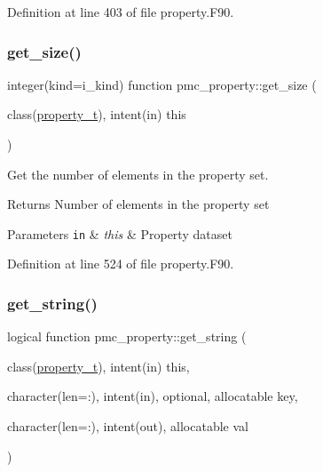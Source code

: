 Definition at line 403 of file property.\+F90.

\mbox{\label{namespacepmc__property_a51142a5a96c616638b781bc56dd808a9}} 
\subsubsection{\texorpdfstring{get\+\_\+size()}{get\_size()}}
{\footnotesize\ttfamily integer(kind=i\+\_\+kind) function pmc\+\_\+property\+::get\+\_\+size (\begin{DoxyParamCaption}\item[{class(\mbox{\hyperlink{structpmc__property_1_1property__t}{property\+\_\+t}}), intent(in)}]{this }\end{DoxyParamCaption})\hspace{0.3cm}{\ttfamily [private]}}



Get the number of elements in the property set. 

\begin{DoxyReturn}{Returns}
Number of elements in the property set
\end{DoxyReturn}

\begin{DoxyParams}[1]{Parameters}
\mbox{\tt in}  & {\em this} & Property dataset \\
\hline
\end{DoxyParams}


Definition at line 524 of file property.\+F90.

\mbox{\label{namespacepmc__property_a24b01526021e6f86df84ced42994bdf8}} 
\subsubsection{\texorpdfstring{get\+\_\+string()}{get\_string()}}
{\footnotesize\ttfamily logical function pmc\+\_\+property\+::get\+\_\+string (\begin{DoxyParamCaption}\item[{class(\mbox{\hyperlink{structpmc__property_1_1property__t}{property\+\_\+t}}), intent(in)}]{this,  }\item[{character(len=\+:), intent(in), optional, allocatable}]{key,  }\item[{character(len=\+:), intent(out), allocatable}]{val }\end{DoxyParamCaption})\hspace{0.3cm}{\ttfamily [private]}}



